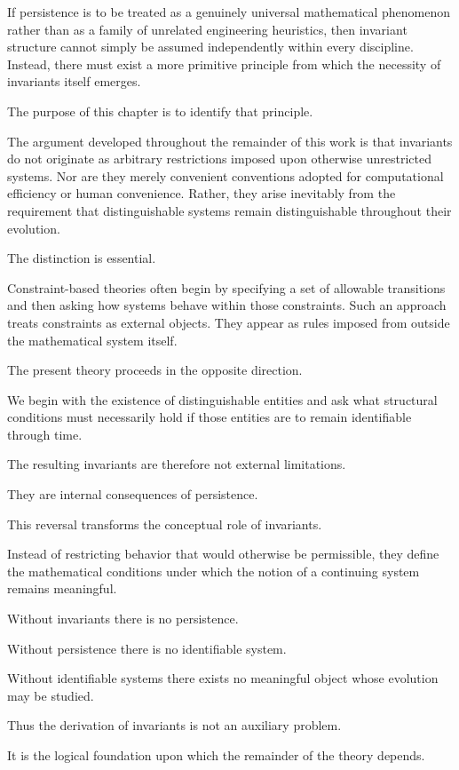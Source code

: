 \documentclass[11pt]{book}
\numberwithin{equation}{chapter}
\theoremstyle{definition}
\theoremstyle{plain}
\begin{document}
If persistence is to be treated as a genuinely universal mathematical phenomenon rather than as a family of unrelated engineering heuristics, then invariant structure cannot simply be assumed independently within every discipline. Instead, there must exist a more primitive principle from which the necessity of invariants itself emerges.

The purpose of this chapter is to identify that principle.

The argument developed throughout the remainder of this work is that invariants do not originate as arbitrary restrictions imposed upon otherwise unrestricted systems. Nor are they merely convenient conventions adopted for computational efficiency or human convenience. Rather, they arise inevitably from the requirement that distinguishable systems remain distinguishable throughout their evolution.

The distinction is essential.

Constraint-based theories often begin by specifying a set of allowable transitions and then asking how systems behave within those constraints. Such an approach treats constraints as external objects. They appear as rules imposed from outside the mathematical system itself.

The present theory proceeds in the opposite direction.

We begin with the existence of distinguishable entities and ask what structural conditions must necessarily hold if those entities are to remain identifiable through time.

The resulting invariants are therefore not external limitations.

They are internal consequences of persistence.

This reversal transforms the conceptual role of invariants.

Instead of restricting behavior that would otherwise be permissible, they define the mathematical conditions under which the notion of a continuing system remains meaningful.

Without invariants there is no persistence.

Without persistence there is no identifiable system.

Without identifiable systems there exists no meaningful object whose evolution may be studied.

Thus the derivation of invariants is not an auxiliary problem.

It is the logical foundation upon which the remainder of the theory depends.
\end{document}
